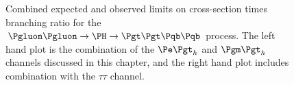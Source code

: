 \begin{figure}
\begin{center}

\end{center}
\caption{
Combined expected and observed limits on cross-section times branching ratio for the
$\Pgluon\Pgluon\to\PH\to\Pgt\Pgt\Pqb\Pqb$ process. The left hand plot is the
combination of the $\etau$ and $\mutau$ channels discussed in this chapter, and
the right hand plot includes combination with the $\tau\tau$ channel.}
\label{fig:HhhCmblimits}
\end{figure} 
